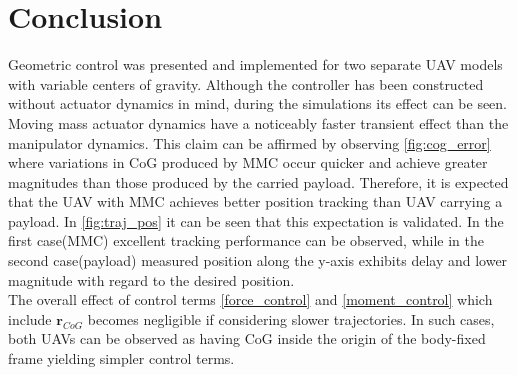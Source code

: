 \section{Conclusion}
Geometric control was presented and implemented for two separate UAV models with variable centers of gravity. Although the controller has been constructed without actuator dynamics in mind, during the simulations its effect can be seen. \\
Moving mass actuator dynamics have a noticeably faster transient effect than the manipulator dynamics. This claim can be affirmed by observing \ref{fig:cog_error} where variations in CoG produced by MMC occur quicker and achieve greater magnitudes than those produced by the carried payload. Therefore, it is expected that the UAV with MMC achieves better position tracking than UAV carrying a payload. In \ref{fig:traj_pos} it can be seen that this expectation is validated. In the first case(MMC) excellent tracking performance can be observed, while in the second case(payload) measured position along the y-axis exhibits delay and lower magnitude with regard to the desired position. \\
The overall effect of control terms \ref{force_control} and \ref{moment_control} which include $\textbf{r}_{CoG}$ becomes negligible if considering slower trajectories. In such cases, both UAVs can be observed as having CoG inside the origin of the body-fixed frame yielding simpler control terms.

